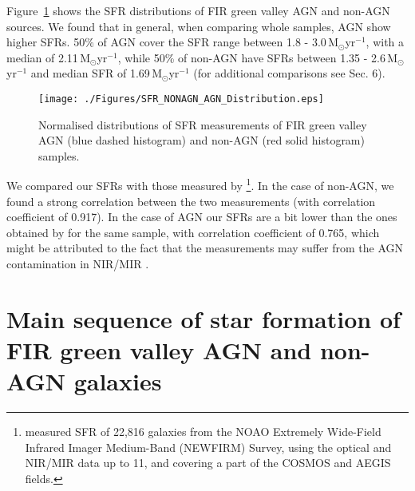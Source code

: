 \documentclass[fleqn,usenatbib]{mnras}
\begin{document}
Figure~\ref{HIST} shows the SFR distributions of FIR green valley AGN and non-AGN sources. We found that in general, when comparing whole samples, AGN show higher SFRs. 50\% of AGN cover the SFR range between 1.8 - 3.0\,M$_{\odot}$yr$^{-1}$, with a median of 2.11\,M$_{\odot}$yr$^{-1}$, while 50\% of non-AGN have SFRs between 1.35 - 2.6\,M$_{\odot}$yr$^{-1}$ and median SFR of 1.69\,M$_{\odot}$yr$^{-1}$ (for additional comparisons see Sec. 6).

\begin{figure}
\centering
\texttt{[image: ./Figures/SFR\_NONAGN\_AGN\_Distribution.eps]}
\caption{Normalised distributions of SFR measurements of FIR green valley AGN (blue dashed histogram) and non-AGN (red solid histogram) samples.
\label{HIST}}
\end{figure}

We compared our SFRs with those measured by \citet{Whitaker}\footnote{\citet{Whitaker} measured SFR of 22,816 galaxies from the NOAO Extremely Wide-Field Infrared Imager Medium-Band (NEWFIRM) Survey, using the optical and NIR/MIR data up to 11\micron, and covering a part of the COSMOS and AEGIS fields.}. In the case of non-AGN, we found a strong correlation between the two measurements (with correlation coefficient of 0.917). In the case of AGN our SFRs are a bit lower than the ones obtained by \citet{Whitaker} for the same sample, with correlation coefficient of 0.765, which might be attributed to the fact that the \citet{Whitaker} measurements may suffer from the AGN contamination in NIR/MIR \citep{Donley,Rujopakarn}. 


\section{Main sequence of star formation of FIR green valley AGN and non-AGN galaxies}
\end{document}
